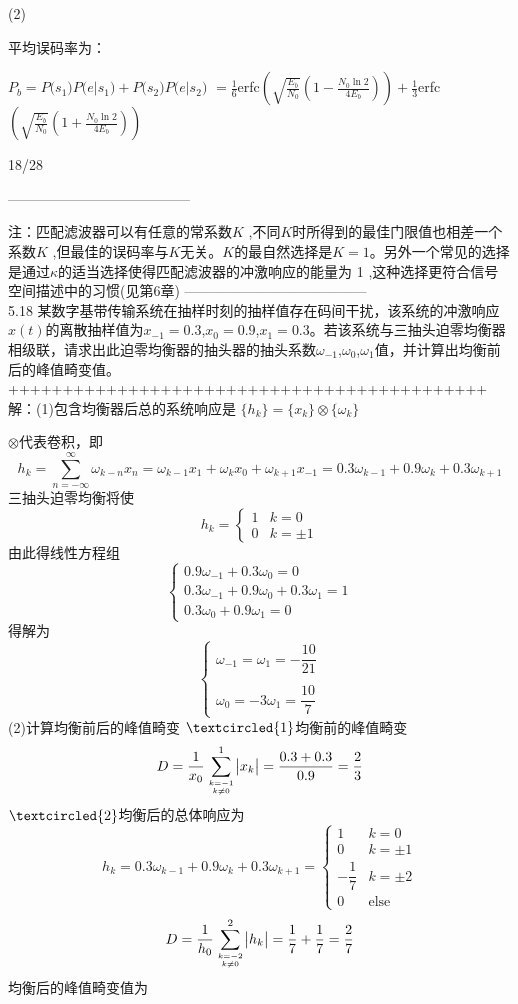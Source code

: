 \documentclass[utf8]{article}
\begin{document}
(2)


平均误码率为：

$P_{b}=P\Big(s_{1}\Big)P\Big(e\Big|s_{1}\Big)+P\Big(s_{2}\Big)P\Big(e\Big|s_{2}\Big)$
$=\frac{1}{6}$erfc$\left(\sqrt{\frac{E_{b}}{N_{0}}}\left(1-\frac{N_{0}\ln2}{4E_{b}}\right)\right)+\frac{1}{3}$erfc$\left(\sqrt{\frac{E_{b}}{N_{0}}}\left(1+\frac{N_{0}\ln2}{4E_{b}}\right)\right)$

18/28

---------------------------------------

注：匹配滤波器可以有任意的常系数$K$ ,不同$K$时所得到的最佳门限值也相差一个系数$K$ ,但最佳的误码率与$K$无关。$K$的最自然选择是$K=1$。另外一个常见的选择是通过$\kappa$的适当选择使得匹配滤波器的冲激响应的能量为 1 ,这种选择更符合信号空间描述中的习惯(见第6章)
---------------------------------------\\
5.18 某数字基带传输系统在抽样时刻的抽样值存在码间干扰，该系统的冲激响应$x(t)$的离散抽样值为$x_{-1}=0.3$,$x_0=0.9$,$x_1=0.3$。若该系统与三抽头迫零均衡器相级联，请求出此迫零均衡器的抽头器的抽头系数$\omega_{-1}$,$\omega_0$,$\omega_1$值，并计算出均衡前后的峰值畸变值。
++++++++++++++++++++++++++++++++++++++++++++\\
解：(1)包含均衡器后总的系统响应是
$\{h_k\}=\{x_k\}\otimes\{\omega_k\}$


$\otimes$代表卷积，即
$$h_k=\sum_{n=-\infty}^\infty\omega_{k-n}x_n=\omega_{k-1}x_1+\omega_kx_0+\omega_{k+1}x_{-1}=0.3\omega_{k-1}+0.9\omega_k+0.3\omega_{k+1}$$
三抽头迫零均衡将使
$$h_k=\begin{cases}1&k=0\\0&k=\pm1\end{cases}$$
由此得线性方程组
$$\begin{cases}0.9\omega_{-1}+0.3\omega_0=0\\0.3\omega_{-1}+0.9\omega_0+0.3\omega_1=1\\0.3\omega_0+0.9\omega_1=0\end{cases}$$
得解为
$$\begin{cases}\omega_{-1}=\omega_1=-\dfrac{10}{21}\\\\\omega_0=-3\omega_1=\dfrac{10}{7}\end{cases}$$
(2)计算均衡前后的峰值畸变
$\textcircled{1}$均衡前的峰值畸变
$$D=\dfrac{1}{x_0}\sum\limits_{k=-1\atop k\neq0}^1\bigl|x_k\bigr|=\dfrac{0.3+0.3}{0.9}=\dfrac{2}{3}$$
$\textcircled{2}$均衡后的总体响应为
$$h_{k}=0.3\omega_{k-1}+0.9\omega_{k}+0.3\omega_{k+1}=\begin{cases}1&k=0\\0&k=\pm1\\-\dfrac{1}{7}&k=\pm2\\0&\text{else}\end{cases}$$
$$D=\dfrac{1}{h_0}\sum\limits_{k=-2\atop k\neq0}^2\bigl|h_k\bigr|=\dfrac{1}{7}+\dfrac{1}{7}=\dfrac{2}{7}$$
均衡后的峰值畸变值为
\end{document}
